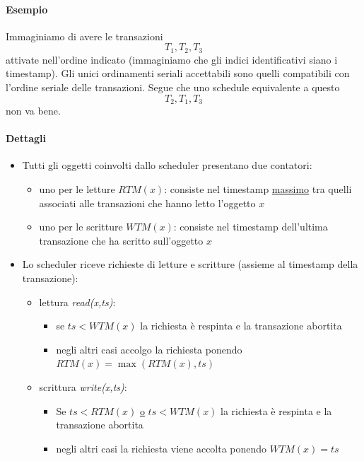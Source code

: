 \paragraph{Esempio} Immaginiamo di avere le transazioni 
\[T_1,T_2,T_3\]
attivate nell'ordine indicato (immaginiamo che gli indici identificativi siano i timestamp). Gli unici ordinamenti seriali accettabili sono quelli compatibili con l'ordine seriale delle transazioni. Segue che uno schedule equivalente a questo
\[T_2,T_1,T_3\]
non va bene.
\paragraph{Dettagli}
\begin{itemize}
	\item Tutti gli oggetti coinvolti dallo scheduler presentano due contatori: 
	\begin{itemize}
		\item uno per le letture $RTM(x)$: consiste nel timestamp \underline{massimo} tra quelli associati alle transazioni che hanno letto l'oggetto $x$
		\item uno per le scritture $WTM(x)$: consiste nel timestamp dell'ultima transazione che ha scritto sull'oggetto $x$
	\end{itemize}
	\item Lo scheduler riceve richieste di letture e scritture (assieme al timestamp della transazione):
	\begin{itemize}
		\item lettura \emph{read(x,ts)}:
		\begin{itemize}
			\item se $\boxed{ts < WTM(x)}$ la richiesta è respinta e la transazione abortita
			\item negli altri casi accolgo la richiesta ponendo $\boxed{RTM(x) = \max(RTM(x),ts)}$
		\end{itemize}
		\item scrittura \emph{write(x,ts)}:
		\begin{itemize}
			\item Se $\boxed{ts < RTM(x)}$ \underline{o} $\boxed{ts < WTM(x)}$ la richiesta è respinta e la transazione abortita
			\item negli altri casi la richiesta viene accolta ponendo $\boxed{WTM(x) = ts}$
		\end{itemize}
	\end{itemize}
\end{itemize}
